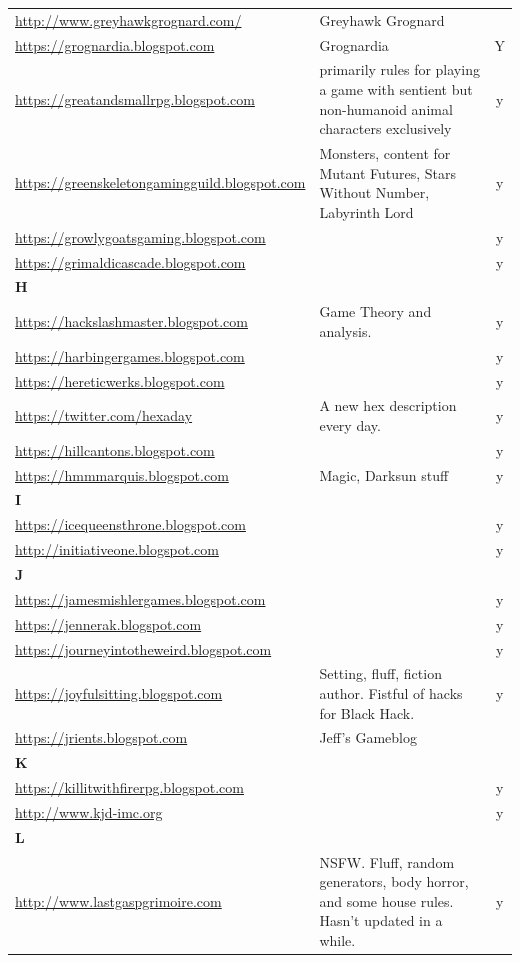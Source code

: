 \documentclass[a4paper, 11pt, twoside]{article}
\begin{document}
\begin{longtable}{p{6cm}p{8cm}c}
\url{http://www.greyhawkgrognard.com/} & Greyhawk Grognard & \\
\url{https://grognardia.blogspot.com} & Grognardia & Y\\
\url{https://greatandsmallrpg.blogspot.com} & primarily rules for playing a game with sentient but non-humanoid animal characters exclusively & y\\
\url{https://greenskeletongamingguild.blogspot.com} & Monsters, content for Mutant Futures, Stars Without Number, Labyrinth Lord & y\\
\url{https://growlygoatsgaming.blogspot.com} &  & y\\
\url{https://grimaldicascade.blogspot.com} &  & y\\
\textbf{H} &  & \\
\url{https://hackslashmaster.blogspot.com} & Game Theory and analysis. & y\\
\url{https://harbingergames.blogspot.com} &  & y\\
\url{https://hereticwerks.blogspot.com} &  & y\\
\url{https://twitter.com/hexaday} & A new hex description every day. & y\\
\url{https://hillcantons.blogspot.com} &  & y\\
\url{https://hmmmarquis.blogspot.com} & Magic, Darksun stuff & y\\
\textbf{I} &  & \\
\url{https://icequeensthrone.blogspot.com} &  & y\\
\url{http://initiativeone.blogspot.com} &  & y\\
\textbf{J} &  & \\
\url{https://jamesmishlergames.blogspot.com} &  & y\\
\url{https://jennerak.blogspot.com} &  & y\\
\url{https://journeyintotheweird.blogspot.com} &  & y\\
\url{https://joyfulsitting.blogspot.com} & Setting, fluff, fiction author. Fistful of hacks for Black Hack. & y\\
\url{https://jrients.blogspot.com} & Jeff's Gameblog & \\
\textbf{K} &  & \\
\url{https://killitwithfirerpg.blogspot.com} &  & y\\
\url{http://www.kjd-imc.org} &  & y\\
\textbf{L} &  & \\
\url{http://www.lastgaspgrimoire.com} & NSFW. Fluff, random generators, body horror, and some house rules. Hasn't updated in a while. & y\\

\end{longtable}
\end{document}
